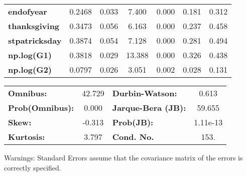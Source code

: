 \begin{center}
\begin{tabular}{lcccccc}
\textbf{endofyear}                         &       0.2468  &        0.033     &     7.400  &         0.000        &        0.181    &        0.312     \\
\textbf{thanksgiving}                      &       0.3473  &        0.056     &     6.163  &         0.000        &        0.237    &        0.458     \\
\textbf{stpatricksday}                     &       0.3874  &        0.054     &     7.128  &         0.000        &        0.281    &        0.494     \\
\textbf{np.log(G1)}                        &       0.3818  &        0.029     &    13.388  &         0.000        &        0.326    &        0.438     \\
\textbf{np.log(G2)}                        &       0.0797  &        0.026     &     3.051  &         0.002        &        0.028    &        0.131     \\
\bottomrule
\end{tabular}
\begin{tabular}{lclc}
\textbf{Omnibus:}       & 42.729 & \textbf{  Durbin-Watson:     } &    0.613  \\
\textbf{Prob(Omnibus):} &  0.000 & \textbf{  Jarque-Bera (JB):  } &   59.655  \\
\textbf{Skew:}          & -0.313 & \textbf{  Prob(JB):          } & 1.11e-13  \\
\textbf{Kurtosis:}      &  3.797 & \textbf{  Cond. No.          } &     153.  \\
\bottomrule
\end{tabular}
\end{center}

Warnings: \newline
 [1] Standard Errors assume that the covariance matrix of the errors is correctly specified.